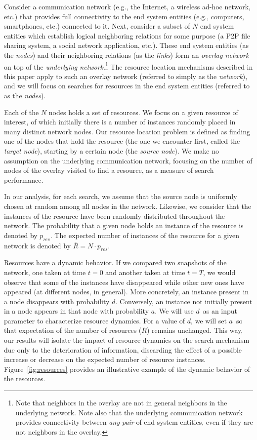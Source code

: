 \documentclass[]{elsarticle}
\newcommand{\N}		{\ensuremath{N}}		\newcommand{\kave}      {\ensuremath{\overline{k}}}     \newcommand{\kRWexp}    {\ensuremath{\overline{k}_{rw}}}\newcommand{\R}		{\ensuremath{\overline{R}}}		\newcommand{\pd}	{\ensuremath{d}}		\newcommand{\pa}	{\ensuremath{a}}
\newcommand{\pnoderes}  {\ensuremath{p_{res}}}
\begin{document}
Consider a communication network (e.g., the Internet, a wireless ad-hoc network, etc.) that provides full connectivity to the end system entities (e.g., computers, smartphones, etc.) connected to it. Next, consider a subset of $N$ end system entities which establish logical neighboring relations for some purpose (a P2P file sharing system, a social network application, etc.). These end system entities (as the \emph{nodes}) and their neighboring relations (as the \emph{links}) form an \emph{overlay network} on top of the \emph{underlying network}.\footnote{Note that neighbors in the overlay are not in general neighbors in the underlying network. Note also that the underlying communication network provides connectivity between \emph{any pair} of end system entities, even if they are not neighbors in the overlay.}
The resource location mechanisms described in this paper apply to such an overlay network (referred to simply as the \emph{network}), and we will focus on searches for resources in the end system entities (referred to as the \emph{nodes}).




Each of the $N$ nodes holds a set of resources. We focus on a given resource of interest, of which initially there is a number of instances randomly placed in many distinct network nodes. Our resource location problem is defined as finding one of the nodes that hold the resource (the one we encounter first, called the \emph{target node}), starting by a certain node (the \emph{source node}). We make no assumption on the underlying communication network, focusing on the number of nodes of the overlay visited to find a resource, as a measure of search performance.

In our analysis, for each search, we assume that the source node is uniformly chosen at random among all nodes in the network. Likewise, we consider that the instances of the resource have been randomly distributed throughout the network. The probability that a given node holds an instance of the resource is denoted by \pnoderes. The expected number of instances of the resource for a given network is denoted by $\R=\N\cdot\pnoderes$.

Resources have a dynamic behavior. If we compared two snapshots of the network, one taken at time $t\!=\!0$ and another taken at time $t\!=\!T$, we would observe that some of the instances have disappeared while other new ones have appeared (at different nodes, in general).
More concretely, an instance present in a node disappears with probability \pd. Conversely, an instance not initially present in a node appears in that node with probability \pa. We will use \pd\ as an input parameter to characterize resource dynamics. For a value of \pd, we will set \pa\ so that expectation of the number of resources (\R) remains unchanged. This way, our results will isolate the impact of resource dynamics on the search mechanism due only to the deterioration of information, discarding the effect of a possible increase or decrease on the expected number of resource instances. Figure~\ref{fig:resources} provides an illustrative example of the dynamic behavior of the resources.
\end{document}
